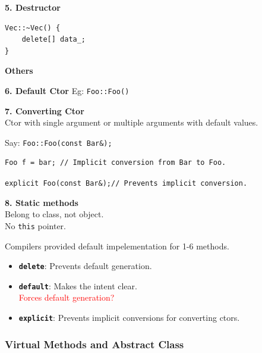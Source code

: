 \textbf{5. Destructor}

\begin{mdframed}[nobreak=true,backgroundcolor=gray!10,linecolor=Firebrick4]
\begin{verbatim}
Vec::~Vec() {
    delete[] data_;
}    
\end{verbatim}
\end{mdframed}

\begin{center}
\textbf{Others}
\end{center}

\textbf{6. Default Ctor}
Eg: \texttt{Foo::Foo(){}}

\textbf{7. Converting Ctor}\\
Ctor with single argument or multiple arguments with default values.\\
\begin{mdframed}[nobreak=true,backgroundcolor=gray!10,linecolor=Firebrick4]
Say: \texttt{Foo::Foo(const Bar\&);}
\begin{verbatim}
Foo f = bar; // Implicit conversion from Bar to Foo.
\end{verbatim}
\texttt{explicit Foo(const Bar\&);// Prevents implicit conversion.} 
\end{mdframed}

\textbf{8. Static methods}\\
Belong to class, not object.\\
No \texttt{this} pointer.\\


\vfill\null
\columnbreak


\begin{mdframed}[nobreak=true,backgroundcolor=magenta!10,linecolor=magenta]
Compilers provided default impelementation for 1-6 methods.
\begin{itemize}
\item \textbf{\texttt{delete}}: Prevents default generation.
\item \textbf{\texttt{default}}: Makes the intent clear.\\
                                 \textcolor{red}{Forces default generation?}
\item \textbf{\texttt{explicit}}: Prevents implicit conversions for converting ctors.
\end{itemize}
\end{mdframed}


\subsubsection{Virtual Methods and Abstract Class}

